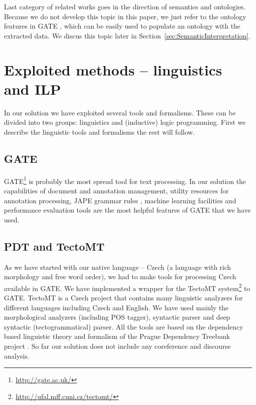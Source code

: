 \documentclass[runningheads,a4paper]{llncs}
\begin{document}
Last category of related works goes in the direction of semantics and ontologies. Because we do not develop this topic in this paper, we just refer to the ontology features in GATE \cite{Bon04b}, which can be easily used to populate an ontology with the extracted data. We discus this topic later in Section~\ref{sec:SemanticInterpretation}.




\section{Exploited methods -- linguistics and ILP}
In our solution we have exploited several tools and formalisms. These can be divided into two groups: linguistics and (inductive) logic programming. First we describe the linguistic tools and formalisms the rest will follow.

\subsection{GATE}
GATE\footnote{\url{http://gate.ac.uk/}} \cite{dedek:GATE_course} is probably the most spread tool for text processing. In our solution the capabilities of document and annotation management, utility resources for annotation processing, JAPE grammar rules \cite{Cunningham00jape:a}, machine learning facilities and performance evaluation tools are the most helpful features of GATE that we have used.

\subsection{PDT and TectoMT}
As we have started with our native language -- Czech (a language with rich morphology and free word order), we had to make tools for processing Czech available in GATE. We have implemented a wrapper for the TectoMT system\footnote{\url{http://ufal.mff.cuni.cz/tectomt/}} \cite{dedek:ZaPtTectoMTHighly2008} to GATE. TectoMT is a Czech project that contains many linguistic analyzers for different languages including Czech and English. We have used mainly the morphological analyzers (including POS tagger), syntactic parser and deep syntactic (tectogrammatical) parser. All the tools are based on the dependency based linguistic theory and formalism of the Prague Dependency Treebank project \cite{dedek:PDT20_CD}. So far our solution does not include any coreference and discourse analysis.
\end{document}
